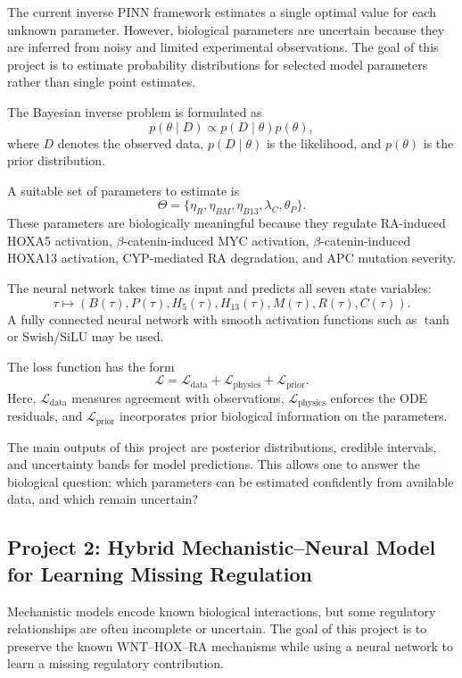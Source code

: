 \documentclass[11pt]{article}
\begin{document}
The current inverse PINN framework estimates a single optimal value for each
unknown parameter. However, biological parameters are uncertain because they are
inferred from noisy and limited experimental observations. The goal of this project
is to estimate probability distributions for selected model parameters rather than
single point estimates.

The Bayesian inverse problem is formulated as
\[
p(\theta\mid D)\propto p(D\mid \theta)p(\theta),
\]
where $D$ denotes the observed data, $p(D\mid \theta)$ is the likelihood, and
$p(\theta)$ is the prior distribution.

A suitable set of parameters to estimate is
\[
\Theta=
\{\eta_R,\eta_{BM},\eta_{B13},\lambda_C,\theta_P\}.
\]
These parameters are biologically meaningful because they regulate RA-induced
HOXA5 activation, $\beta$-catenin-induced MYC activation, $\beta$-catenin-induced
HOXA13 activation, CYP-mediated RA degradation, and APC mutation severity.

The neural network takes time as input and predicts all seven state variables:
\[
\tau \longmapsto
(B(\tau),P(\tau),H_5(\tau),H_{13}(\tau),M(\tau),R(\tau),C(\tau)).
\]
A fully connected neural network with smooth activation functions such as
$\tanh$ or Swish/SiLU may be used.

The loss function has the form
\[
\mathcal L
=
\mathcal L_{\mathrm{data}}
+
\mathcal L_{\mathrm{physics}}
+
\mathcal L_{\mathrm{prior}}.
\]
Here, $\mathcal L_{\mathrm{data}}$ measures agreement with observations,
$\mathcal L_{\mathrm{physics}}$ enforces the ODE residuals, and
$\mathcal L_{\mathrm{prior}}$ incorporates prior biological information on the
parameters.

The main outputs of this project are posterior distributions, credible intervals,
and uncertainty bands for model predictions. This allows one to answer the
biological question: which parameters can be estimated confidently from available
data, and which remain uncertain?

\subsection{Project 2: Hybrid Mechanistic--Neural Model for Learning Missing Regulation}

Mechanistic models encode known biological interactions, but some regulatory
relationships are often incomplete or uncertain. The goal of this project is to
preserve the known WNT--HOX--RA mechanisms while using a neural network to learn
a missing regulatory contribution.
\end{document}

